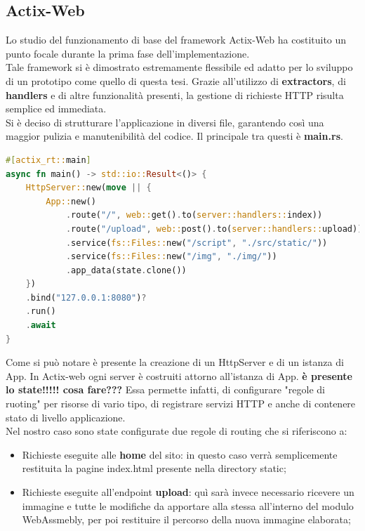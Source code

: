 \subsection{Actix-Web}
Lo studio del funzionamento di base del framework Actix-Web ha costituito un punto focale durante la prima fase dell'implementazione.
\\Tale framework si è dimostrato estremamente flessibile ed adatto per lo sviluppo di un prototipo come quello di questa tesi.
Grazie all'utilizzo di \textbf{extractors}, di \textbf{handlers} e di altre funzionalità presenti, la gestione di richieste HTTP risulta semplice ed immediata.
\\Si è deciso di strutturare l'applicazione in diversi file, garantendo così una maggior pulizia e manutenibilità del codice. Il principale tra questi è \textbf{main.rs}.
\begin{lstlisting}[language=rust, label=lst:RustWasi, caption={Porzione del file main.rs}, showstringspaces=false]
#[actix_rt::main]
async fn main() -> std::io::Result<()> {
    HttpServer::new(move || {
        App::new()
            .route("/", web::get().to(server::handlers::index))
            .route("/upload", web::post().to(server::handlers::upload))
            .service(fs::Files::new("/script", "./src/static/"))
            .service(fs::Files::new("/img", "./img/"))
            .app_data(state.clone())
    })
    .bind("127.0.0.1:8080")?
    .run()
    .await
}
\end{lstlisting}
Come si può notare è presente la creazione di un HttpServer e di un istanza di App. In Actix-web ogni server è costruiti attorno all'istanza di App.
\textbf{è presente lo state!!!!! cosa fare???} Essa permette infatti, di configurare "regole di ruoting" per risorse di vario tipo, di registrare servizi HTTP e anche di contenere stato di livello applicazione. 
\\Nel nostro caso sono state configurate due regole di routing che si riferiscono a: 
\begin{itemize}
    \item Richieste eseguite alle \textbf{home} del sito: in questo caso verrà semplicemente restituita la pagine index.html presente nella directory static;
    \item Richieste eseguite all'endpoint \textbf{\/upload}: quì sarà invece necessario ricevere un immagine e tutte le modifiche da apportare alla stessa all'interno del modulo WebAssmebly, per poi restituire il percorso della nuova immagine elaborata;
\end{itemize}
